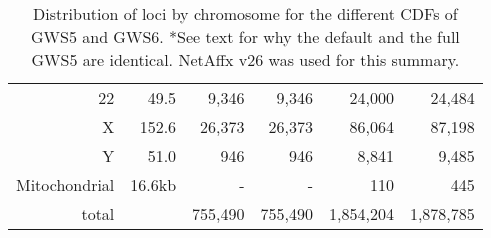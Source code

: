 \documentclass[10pt,a4paper]{article}
\begin{document}
\begin{table}[hp]
\begin{center}
\begin{tabular}{|r|r||rr||rr|}
22 &  49.5   &  9,346  &   9,346  &   24,000  &   24,484  \\
X  & 152.6   & 26,373  &  26,373  &   86,064  &   87,198  \\
Y  &  51.0   &    946  &     946  &    8,841  &    9,485  \\
\hline
Mitochondrial  &  16.6kb &      -  &       -  &      110  &      445  \\
\hline
total  &     & 755,490 &  755,490 & 1,854,204 & 1,878,785 \\
\hline
\end{tabular}
\end{center}
\caption{Distribution of loci by chromosome for the different CDFs of GWS5 and GWS6.  *See text for why the default and the full GWS5 are identical.  NetAffx v26 was used for this summary.}
\label{tblGenomicLocationByChromosome}
\end{table}


\clearpage
\end{document}
